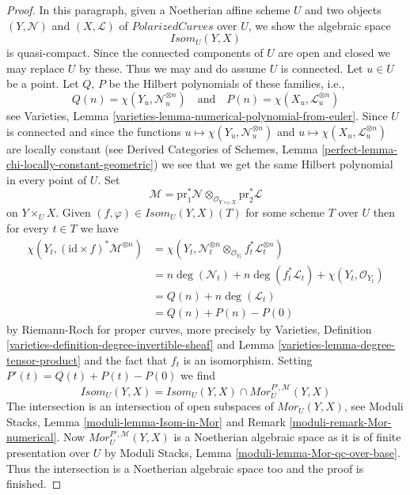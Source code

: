 \begin{proof}
\medskip\noindent
In this paragraph, given a Noetherian affine scheme $U$ and two objects
$(Y, \mathcal{N})$ and $(X, \mathcal{L})$
of $\textit{PolarizedCurves}$ over $U$, we show the algebraic space
$$
\mathit{Isom}_U(Y, X)
$$
is quasi-compact. Since the connected components of $U$ are open and closed
we may replace $U$ by these. Thus we may and do assume $U$ is connected.
Let $u \in U$ be a point. Let $Q$, $P$ be the Hilbert polynomials
of these families, i.e.,
$$
Q(n) = \chi(Y_u, \mathcal{N}_u^{\otimes n})
\quad\text{and}\quad
P(n) = \chi(X_u, \mathcal{L}_u^{\otimes n})
$$
see Varieties, Lemma \ref{varieties-lemma-numerical-polynomial-from-euler}.
Since $U$ is connected and since
the functions
$u \mapsto \chi(Y_u, \mathcal{N}_u^{\otimes n})$ and
$u \mapsto \chi(X_u, \mathcal{L}_u^{\otimes n})$
are locally constant (see
Derived Categories of Schemes, Lemma
\ref{perfect-lemma-chi-locally-constant-geometric})
we see that we get the same Hilbert polynomial in every point of $U$.
Set
$$
\mathcal{M} = \text{pr}_1^*\mathcal{N}
\otimes_{\mathcal{O}_{Y \times_U X}} \text{pr}_2^*\mathcal{L}
$$
on $Y \times_U X$. Given $(f, \varphi) \in \mathit{Isom}_U(Y, X)(T)$
for some scheme $T$ over $U$ then for every $t \in T$ we have
\begin{align*}
\chi(Y_t, (\text{id} \times f)^*\mathcal{M}^{\otimes n})
& =
\chi(Y_t,
\mathcal{N}_t^{\otimes n} \otimes_{\mathcal{O}_{Y_t}}
f_t^*\mathcal{L}_t^{\otimes n}) \\
& =
n\deg(\mathcal{N}_t) + n\deg(f_t^*\mathcal{L}_t) +
\chi(Y_t, \mathcal{O}_{Y_t}) \\
& =
Q(n) + n\deg(\mathcal{L}_t) \\
& =
Q(n) + P(n) - P(0)
\end{align*}
by Riemann-Roch for proper curves, more precisely by
Varieties, Definition \ref{varieties-definition-degree-invertible-sheaf} and
Lemma \ref{varieties-lemma-degree-tensor-product}
and the fact that $f_t$ is an isomorphism.
Setting $P'(t) = Q(t) + P(t) - P(0)$ we find
$$
\mathit{Isom}_U(Y, X) =
\mathit{Isom}_U(Y, X) \cap \mathit{Mor}^{P', \mathcal{M}}_U(Y, X)
$$
The intersection is an intersection of open subspaces of
$\mathit{Mor}_U(Y, X)$, see
Moduli Stacks, Lemma \ref{moduli-lemma-Isom-in-Mor} and
Remark \ref{moduli-remark-Mor-numerical}.
Now $\mathit{Mor}^{P', \mathcal{M}}_U(Y, X)$
is a Noetherian algebraic space as it is of finite
presentation over $U$ by
Moduli Stacks, Lemma \ref{moduli-lemma-Mor-qc-over-base}.
Thus the intersection is a Noetherian algebraic space too
and the proof is finished.
\end{proof}

